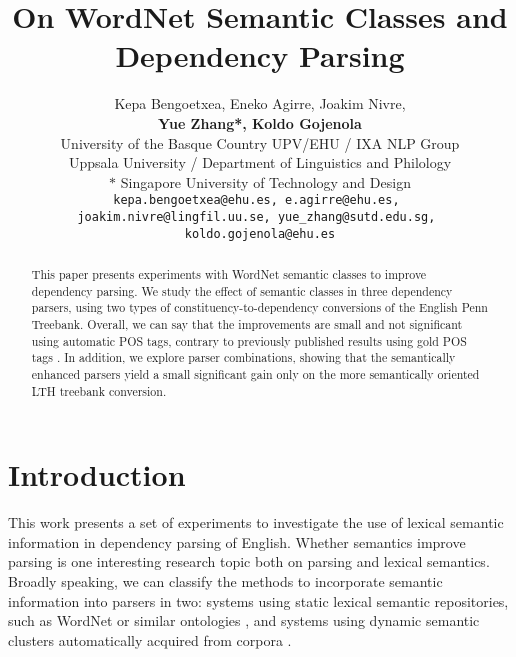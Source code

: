 \documentclass[11pt]{article}
\title{On WordNet Semantic Classes and Dependency Parsing}
\author{Kepa Bengoetxea\dag, Eneko Agirre\dag, Joakim Nivre\ddag, \\ 
{\bf Yue Zhang*, Koldo Gojenola\dag }\\
 \dag University of the Basque Country UPV/EHU / IXA NLP Group \\
  \ddag Uppsala University / Department of Linguistics and Philology \\
  $\ast$ Singapore University of Technology and Design \\
  {\tt \normalsize kepa.bengoetxea@ehu.es, e.agirre@ehu.es, } \\
  {\tt \normalsize joakim.nivre@lingfil.uu.se, yue\_zhang@sutd.edu.sg, } \\
  {\tt \normalsize koldo.gojenola@ehu.es} \\}
\date{}
\begin{document}
\maketitle
\begin{abstract}
This paper presents experiments with WordNet semantic classes to improve dependency parsing. We study
the effect of semantic classes in three dependency parsers, using two types of constituency-to-dependency conversions of the English Penn Treebank. Overall, we can say that the improvements are small and not significant using automatic POS tags, contrary to previously published results using gold POS tags \cite{agirre-EtAl:2011:ACL-HLT2011}.
In addition, we explore parser combinations, showing that the semantically enhanced parsers yield a small significant gain only on the more semantically oriented LTH treebank conversion.
\end{abstract}

\section{Introduction}
This work presents a set of experiments to investigate the use of lexical semantic information in dependency parsing of English. Whether semantics improve parsing is one interesting research topic
both on parsing and lexical semantics. 
Broadly speaking, we can classify the methods to incorporate semantic information into parsers in two: systems using static lexical semantic repositories, such as WordNet or similar ontologies \cite{agirre-baldwin-martinez:2008:ACLMain,agirre-EtAl:2011:ACL-HLT2011,Sanae-Bond-Oepen-Takaaki}, and  systems using dynamic semantic clusters automatically acquired from corpora \cite{koo-carreras-collins:2008:ACLMain,suzuki-EtAl:2009:EMNLP}.



\end{document}
